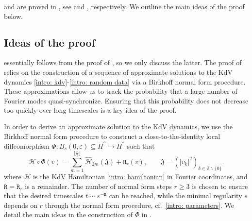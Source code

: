 \documentclass[a4paper,10pt,reqno]{article}
\theoremstyle{definition}
\theoremstyle{plain}
\theoremstyle{plain}
\theoremstyle{definition}
\theoremstyle{plain}
\theoremstyle{plain}
\theoremstyle{plain}
\theoremstyle{definition}
\theoremstyle{definition}
\def \Z{\mathbb Z}
\def \H{\mathcal{H}}
\def \tn{\mathtt{n}}
\begin{document}
 and  are proved in , see  and , respectively. We outline the main ideas of the proof below.

    
\subsection{Ideas of the proof} \label{intro: ideas of the proof}

 essentially follows from the proof of , so we only discuss the latter. The proof of  relies on the construction of a sequence of approximate solutions to the KdV dynamics \eqref{intro: kdv}-\eqref{intro: random data} via a Birkhoff normal form procedure. These approximations allow us to track the probability that a large number of Fourier modes quasi-synchronize. Ensuring that this probability does not decrease too quickly over long timescales is a key idea of the proof.

\smallskip

In order to derive an approximate solution to the KdV dynamics, we use the Birkhoff normal form procedure to construct a close-to-the-identity local diffeomorphism $\Phi : B_s(0,\varepsilon) \subseteq \dot{H}^s \longrightarrow \dot{H}^s$ such that
\begin{equation} \label{intro: normal form}
\H \circ \Phi (v) = \sum_{m=1}^{\lfloor \frac{r}{2}\rfloor} \widehat{\H}_{2m}(\mathfrak{J}) + \mathtt{R}_r (v), \qquad \mathfrak{J}=(|v_k|^2)_{k \in \Z \smallsetminus \{ 0 \}}.
\end{equation}
where $\H$ is the KdV Hamiltonian \eqref{intro: hamiltonian} in Fourier coordinates, and $\mathtt{R}=\mathtt{R}_r$ is a remainder. 
The number of normal form steps $r\geq 3$ is chosen to ensure that the desired timescales $t\sim\varepsilon^{-\tn}$ can be reached, while the minimal regularity $s$ depends on $r$ through the normal form procedure, cf.~\eqref{intro: parameters}. We detail the main ideas in the construction of $\Phi$ in .

\smallskip
\end{document}
